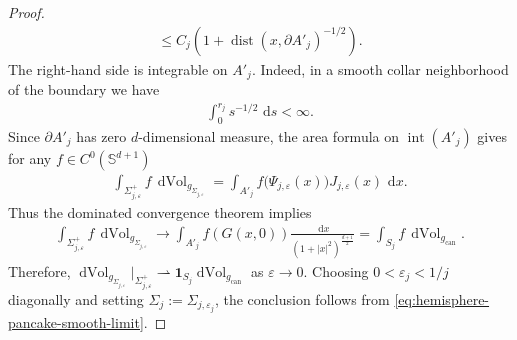 \documentclass[10pt,a4paper]{amsart}
\def\bS {\mathbb{S}}
\newcommand{\can}{\mathrm{can}}
\newcommand{\dist}{\operatorname{dist}}
\newcommand{\dvol}{\operatorname{dVol}}
\newcommand{\ud}{\mathrm{\,d}}
\newcommand{\veps}{\varepsilon}
\newcommand{\wto}{\rightharpoonup}
\begin{document}
\begin{proof}
\begin{align}
        \leq
        C_j ( 1+
        \dist(x,\partial A'_j)^{-1/2}).
\end{align}
The right-hand side is integrable on $A'_j$.  Indeed, in a smooth collar neighborhood of the boundary we have
\begin{align}
        \int_0^{r_j}s^{-1/2}\,\ud s
        <
        \infty.
\end{align}
Since $\partial A'_j$ has zero $d$-dimensional measure, the area formula
on $\operatorname{int}(A'_j)$ gives for any $f\in C^0(\bS^{d+1})$
\begin{align}
        \int_{\Sigma_{j,\varepsilon}^+}
        f\,\dvol_{g_{\Sigma_{j,\varepsilon}}}
        =
        \int_{A'_j}
        f\bigl(\Psi_{j,\varepsilon}(x)\bigr)
        J_{j,\varepsilon}(x)\,\ud x.
\end{align}
Thus the dominated convergence theorem implies
\begin{align}
        \int_{\Sigma_{j,\varepsilon}^+}
        f\,\dvol_{g_{\Sigma_{j,\varepsilon}}}
        \rightarrow
        \int_{A'_j}
        f(G(x,0))
        \frac{\ud x}{(1+|x|^2)^{\frac{d+1}{2}}}
        =
        \int_{S_j}f\,\dvol_{g_{\can}}.
\end{align}
Therefore, $ \dvol_{g_{\Sigma_{j,\varepsilon}}} |_{\Sigma_{j,\varepsilon}^+} \wto \mathbf{1}_{S_j}\dvol_{g_{\can}}$ as $\veps\to 0.$ Choosing $0<\varepsilon_j<1/j$ diagonally and setting $\Sigma_j:=\Sigma_{j,\varepsilon_j}$, the conclusion follows from
\eqref{eq:hemisphere-pancake-smooth-limit}.
\end{proof}
\end{document}
